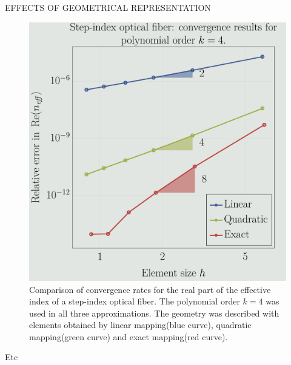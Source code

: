 \documentclass[debug]{beamer} %
\begin{document}
\begin{frame}
\begin{columns}
\begin{column}{0.45\textwidth}
{\begin{block}{\boxnumber EFFECTS OF GEOMETRICAL REPRESENTATION}
        	\begin{figure}[ht]
	            \centering
	            \includegraphics[width=0.7\linewidth]{images/convergenceRates_k4_poster.png}
	            \caption{Comparison of convergence rates for the real part of the effective index of a step-index optical fiber. The polynomial order $k=4$ was used in all three approximations. The geometry was described with elements obtained by linear mapping(blue curve), quadratic mapping(green curve) and exact mapping(red curve).}
	            \label{fig:convergence-step}
        	\end{figure}
        
	        Etc


\end{block}}
\end{column}
\end{columns}
\end{frame}
\end{document}
